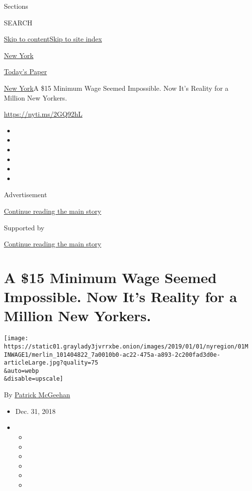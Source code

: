 Sections

SEARCH

\protect\hyperlink{site-content}{Skip to
content}\protect\hyperlink{site-index}{Skip to site index}

\href{https://www.nytimes3xbfgragh.onion/section/nyregion}{New York}

\href{https://myaccount.nytimes3xbfgragh.onion/auth/login?response_type=cookie\&client_id=vi}{}

\href{https://www.nytimes3xbfgragh.onion/section/todayspaper}{Today's
Paper}

\href{/section/nyregion}{New York}\textbar{}A \$15 Minimum Wage Seemed
Impossible. Now It's Reality for a Million New Yorkers.

\url{https://nyti.ms/2GQ92hL}

\begin{itemize}
\item
\item
\item
\item
\item
\item
\end{itemize}

Advertisement

\protect\hyperlink{after-top}{Continue reading the main story}

Supported by

\protect\hyperlink{after-sponsor}{Continue reading the main story}

\hypertarget{a-15-minimum-wage-seemed-impossible-now-its-reality-for-a-million-new-yorkers}{%
\section{A \$15 Minimum Wage Seemed Impossible. Now It's Reality for a
Million New
Yorkers.}\label{a-15-minimum-wage-seemed-impossible-now-its-reality-for-a-million-new-yorkers}}

\texttt{[image: https://static01.graylady3jvrrxbe.onion/images/2019/01/01/nyregion/01MINWAGE1/merlin\_101404822\_7a0010b0-ac22-475a-a893-2c200fad3d0e-articleLarge.jpg?quality=75\\\&auto=webp\\\&disable=upscale]}

By \href{https://www.nytimes3xbfgragh.onion/by/patrick-mcgeehan}{Patrick
McGeehan}

\begin{itemize}
\item
  Dec. 31, 2018
\item
  \begin{itemize}
  \item
  \item
  \item
  \item
  \item
  \item
  \end{itemize}
\end{itemize}

